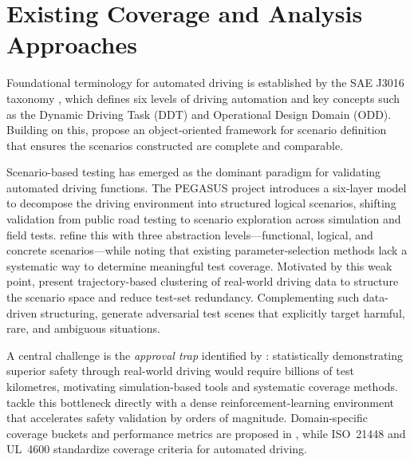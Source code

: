 \section{Existing Coverage and Analysis Approaches}
\label{chapter:existing_approaches}

Foundational terminology for automated driving is established by the SAE J3016 taxonomy \cite{ORAD2021taxonomy}, which defines six levels of driving automation and key concepts such as the Dynamic Driving Task (DDT) 
and Operational Design Domain (ODD). Building on this, \cite{deGelder2022ontology} propose an object-oriented framework for scenario definition that ensures the scenarios constructed are complete and comparable.

Scenario-based testing has emerged as the dominant paradigm for validating automated driving functions. The PEGASUS project \cite{pegasus2019method} introduces a six-layer model to decompose the driving environment into structured logical scenarios, 
shifting validation from public road testing to scenario exploration across simulation and field tests. \cite{DBLP:journals/corr/abs-1801-08598} refine this with three abstraction levels---functional, logical, 
and concrete scenarios---while noting that existing parameter-selection methods lack a systematic way to determine meaningful test coverage. Motivated by this weak point, \cite{Ries2021traj_clustering} present trajectory-based clustering of real-world driving data to structure the scenario space and reduce test-set redundancy. Complementing such data-driven structuring, \cite{zhang2026adversarial} generate adversarial test scenes that explicitly target harmful, rare, and ambiguous situations.

A central challenge is the \emph{approval trap} identified by \cite{wachenfeld2016release}: statistically demonstrating superior safety through real-world driving would require billions of test kilometres, motivating simulation-based tools and systematic coverage methods. \cite{feng2023dense} tackle this bottleneck directly with a dense reinforcement-learning environment that accelerates safety validation by orders of magnitude. Domain-specific coverage buckets and performance metrics are proposed in \cite{foretellix2019}, while ISO~21448 \cite{iso21448} and UL~4600 \cite{ul4600} standardize coverage criteria for automated driving.

